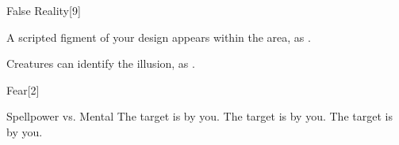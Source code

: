 \begin{spellsection}{False Reality}[9]
    \begin{spellheader}
    \end{spellheader}
    \begin{spellcontent}
        \begin{spelltargetinginfo}
        \end{spelltargetinginfo}
        \begin{spelleffects}
            \spelleffect A scripted figment of your design appears within the area, as .
            \spelldur \durlong \dismissable
        \end{spelleffects}
    \end{spellcontent}
    \begin{spellfooter}
        \spellnotes Creatures can identify the illusion, as .
        \miscastexplode
    \end{spellfooter}
\end{spellsection}

\begin{spellsection}{Fear}[2]
    \begin{spellheader}
    \end{spellheader}
    \begin{spellcontent}
        \begin{spelltargetinginfo}
        \end{spelltargetinginfo}
        \begin{spelleffects}
            \begin{spellattack}{Spellpower vs. Mental}
                \spellsuccess The target is \frightened by you.
                \spellcritical The target is \panicked by you.
                \spellfailure The target is \shaken by you.
            \end{spellattack}
            \spelldur \durbrief
        \end{spelleffects}
    \end{spellcontent}
    \begin{spellfooter}
        \miscastrandom
    \end{spellfooter}
\end{spellsection}

